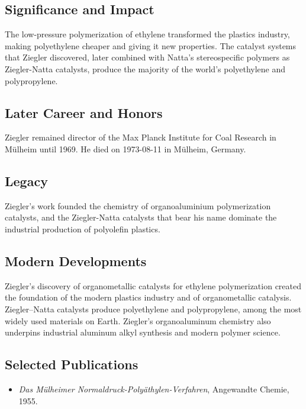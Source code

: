 \subsection*{Significance and Impact}

The low-pressure polymerization of ethylene transformed the plastics industry, making polyethylene cheaper and giving it new properties. The catalyst systems that Ziegler discovered, later combined with Natta's stereospecific polymers as Ziegler-Natta catalysts, produce the majority of the world's polyethylene and polypropylene.

\subsection*{Later Career and Honors}

Ziegler remained director of the Max Planck Institute for Coal Research in M{\"u}lheim until 1969. He died on 1973-08-11 in M{\"u}lheim, Germany.

\subsection*{Legacy}

Ziegler's work founded the chemistry of organoaluminium polymerization catalysts, and the Ziegler-Natta catalysts that bear his name dominate the industrial production of polyolefin plastics.

\subsection*{Modern Developments}

Ziegler's discovery of organometallic catalysts for ethylene polymerization created the foundation of the modern plastics industry and of organometallic catalysis. Ziegler–Natta catalysts produce polyethylene and polypropylene, among the most widely used materials on Earth. Ziegler's organoaluminum chemistry also underpins industrial aluminum alkyl synthesis and modern polymer science.

\subsection*{Selected Publications}

\begin{itemize}

\item \emph{Das M{\"u}lheimer Normaldruck-Poly{\"a}thylen-Verfahren}, Angewandte Chemie, 1955.

\end{itemize}

